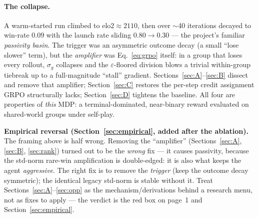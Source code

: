 \documentclass[11pt]{article}
\begin{document}
\paragraph{The collapse.} A warm-started run climbed to $\mathrm{elo2}\approx2110$, then over $\sim$40
iterations decayed to win-rate $0.09$ with the launch rate sliding $0.80\to0.30$ --- the project's
familiar \emph{passivity basin}. The trigger was an asymmetric outcome decay (a small ``lose slower''
term), but the \emph{amplifier} was Eq.~\eqref{eq:grpo} itself: in a group that loses every rollout,
$\sigma_g$ collapses and the $\varepsilon$-floored division blows a trivial within-group tiebreak up to
a full-magnitude ``stall'' gradient. Sections~\ref{sec:A}--\ref{sec:B} dissect and remove that
amplifier; Section~\ref{sec:C} restores the per-step credit assignment GRPO structurally lacks;
Section~\ref{sec:D} tightens the baseline. All four are properties of \emph{this} MDP: a
terminal-dominated, near-binary reward evaluated on shared-world groups under self-play.

\smallskip\noindent\textbf{Empirical reversal (Section~\ref{sec:empirical}, added after the ablation).}
The framing above is half wrong. Removing the ``amplifier'' (Sections~\ref{sec:A}, \ref{sec:B},
\ref{sec:rank}) turned out to be the \emph{wrong} fix --- it causes passivity, because the std-norm
rare-win amplification is double-edged: it is also what keeps the agent \emph{aggressive}. The right fix
is to remove the \emph{trigger} (keep the outcome decay symmetric); the identical legacy std-norm is stable
without it. Treat Sections~\ref{sec:A}--\ref{sec:opp} as the mechanism/derivations behind a research menu,
not as fixes to apply --- the verdict is the red box on page~1 and Section~\ref{sec:empirical}.

\end{document}

